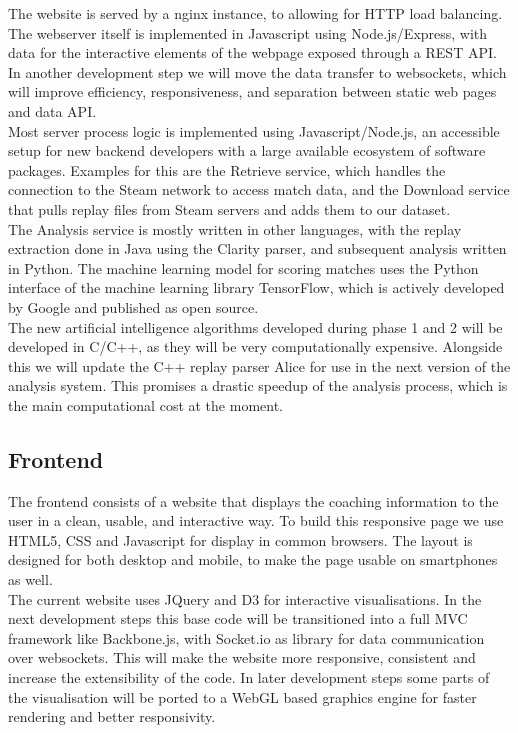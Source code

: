 \documentclass[12pt]{article} %
\begin{document}
The website is served by a nginx instance, to allowing for HTTP load balancing. The webserver itself is implemented in Javascript using Node.js/Express, with data for the interactive elements of the webpage exposed through a REST API. In another development step we will move the data transfer to websockets, which will improve efficiency, responsiveness, and separation between static web pages and data API.\\

Most server process logic is implemented using Javascript/Node.js, an accessible setup for new backend developers with a large available ecosystem of software packages. Examples for this are the Retrieve service, which handles the connection to the Steam network to access match data, and the Download service that pulls replay files from Steam servers and adds them to our dataset.\\ 

The Analysis service is mostly written in other languages, with the replay extraction done in Java using the Clarity parser, and subsequent analysis written in Python. The machine learning model for scoring matches uses the Python interface of the machine learning library TensorFlow, which is actively developed by Google and published as open source.\\

The new artificial intelligence algorithms developed during phase 1 and 2 will be developed in C/C++, as they will be very computationally expensive. Alongside this we will update the C++ replay parser Alice for use in the next version of the analysis system. This promises a drastic speedup of the analysis process, which is the main computational cost at the moment. \\ 

\subsection{Frontend}

The frontend consists of a website that displays the coaching information to the user in a clean, usable, and interactive way. To build this responsive page we use HTML5, CSS and Javascript for display in common browsers. The layout is designed for both desktop and mobile, to make the page usable on smartphones as well.\\

The current website uses JQuery and D3 for interactive visualisations. In the next development steps this base code will be transitioned into a full MVC framework like Backbone.js, with Socket.io as library for data communication over websockets. This will make the website more responsive, consistent and increase the extensibility of the code. In later development steps some parts of the visualisation will be ported to a WebGL based graphics engine for faster rendering and better responsivity.
\end{document}
